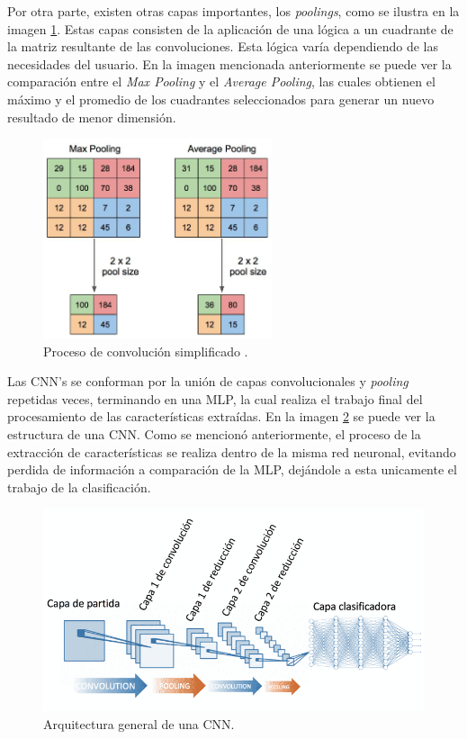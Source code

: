 Por otra parte, existen otras capas importantes, los \textit{poolings}, como se ilustra 
en la imagen \ref{pooling}. Estas capas consisten de la aplicación de una lógica a un 
cuadrante de la matriz resultante de las convoluciones. Esta lógica varía dependiendo 
de las necesidades del usuario. En la imagen mencionada anteriormente se puede ver la 
comparación entre el \textit{Max Pooling} y el \textit{Average Pooling}, las cuales 
obtienen el máximo y el promedio de los cuadrantes seleccionados para generar un nuevo 
resultado de menor dimensión. 

\begin{figure}[h!]
\includegraphics[width=0.6\textwidth]{images/pooling.png}
\centering
\caption{Proceso de convolución simplificado \cite{pooling}.}
\label{pooling}
\end{figure}

Las CNN's se conforman por la unión de capas convolucionales y \textit{pooling} repetidas 
veces, terminando en una MLP, la cual realiza el trabajo final del procesamiento de las 
características extraídas. En la imagen \ref{CNN} se puede ver la estructura de una CNN. 
Como se mencionó anteriormente, el proceso de la extracción de características se realiza 
dentro de la misma red neuronal, evitando perdida de información a comparación de la MLP, 
dejándole a esta unicamente el trabajo de la clasificación.

\begin{figure}[h!]
\includegraphics[width=1\textwidth]{images/CNN.png}
\centering
\caption {Arquitectura general de una CNN\cite{CNN-Arquitectura}. }
\label{CNN}
\end{figure}



